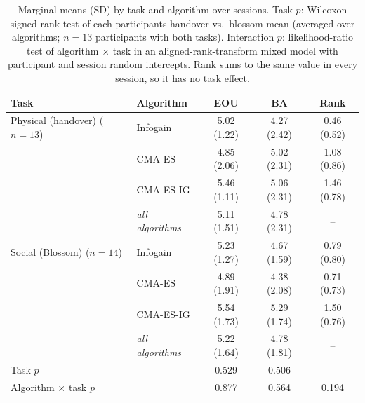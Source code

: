 \begin{table}[t]
\centering
\caption{Marginal means (SD) by task and algorithm over sessions. Task $p$: Wilcoxon signed-rank test of each participant\textquotesingle{}s handover vs.\ blossom mean (averaged over algorithms; $n=13$ participants with both tasks). Interaction $p$: likelihood-ratio test of algorithm $\times$ task in an aligned-rank-transform mixed model with participant and session random intercepts. Rank sums to the same value in every session, so it has no task effect.}
\label{tab:user_study_tasks}
\begin{tabular}{ll ccc}
\toprule
\textbf{Task} & \textbf{Algorithm} & \textbf{EOU} & \textbf{BA} & \textbf{Rank} \\
\midrule
Physical (handover) ($n=13$) & Infogain & 5.02 (1.22) & 4.27 (2.42) & 0.46 (0.52) \\
 & CMA-ES & 4.85 (2.06) & 5.02 (2.31) & 1.08 (0.86) \\
 & CMA-ES-IG & 5.46 (1.11) & 5.06 (2.31) & 1.46 (0.78) \\
 & \textit{all algorithms} & 5.11 (1.51) & 4.78 (2.31) & -- \\
\midrule
Social (Blossom) ($n=14$) & Infogain & 5.23 (1.27) & 4.67 (1.59) & 0.79 (0.80) \\
 & CMA-ES & 4.89 (1.91) & 4.38 (2.08) & 0.71 (0.73) \\
 & CMA-ES-IG & 5.54 (1.73) & 5.29 (1.74) & 1.50 (0.76) \\
 & \textit{all algorithms} & 5.22 (1.64) & 4.78 (1.81) & -- \\
\midrule
\multicolumn{2}{l}{Task $p$} & 0.529 & 0.506 & -- \\
\multicolumn{2}{l}{Algorithm $\times$ task $p$} & 0.877 & 0.564 & 0.194 \\
\bottomrule
\end{tabular}
\end{table}
